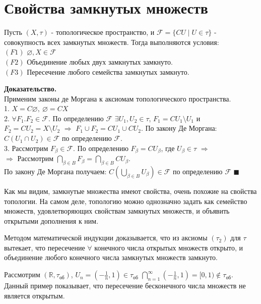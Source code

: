 \section{Свойства замкнутых множеств}
\begin{theorem}
    Пусть $(X,\tau)$ - топологическое пространство, и  $\mathcal{F}=\{
    CU\mid U\in\tau\}$ - совокупность всех замкнутых множеств. Тогда 
    выполняются условия:\\
    $(F1)$ $\varnothing,X\in\mathcal F$\\
    $(F2)$ Объединение любых двух замкнутых замкнуто.\\
    $(F3)$ Пересечение любого семейства замкнутых замкнуто.
    
\textbf{Доказательство.}\\ Применим законы де Моргана к аксиомам топологического пространства.\\
1. $X=C\varnothing,~\varnothing=CX$\\
2. $\forall F_1.F_2{\in}\mathcal{F}$. По определению $\mathcal{F}$ $\exists U_1,U_2{\in}\tau$, $F_1=CU_1{\setminus}U_1$ и $F_2=CU_2=X{\setminus}U_2$ $\Rightarrow$ $F_1{\cup}F_2=CU_1{\cup}CU_2$. По закону Де Моргана: $C(U_1{\cap}U_2){\in}\mathcal{F}$ по определению $\mathcal{F}$.\\
3. Рассмотрим $F_{\beta}{\in}\mathcal{F}$. По определению $F_{\beta}=CU_{\beta}$, где $U_{\beta}{\in}\tau$  $\Rightarrow$\\$\Rightarrow$ Рассмотрим $\bigcap\limits_{\beta{\in}B}F_{\beta}=\bigcap\limits_{\beta{\in}B}CU_{\beta}$.\\По закону Де Моргана получаем: $C(\bigcup\limits_{\beta{\in}B}U_{\beta}){\in}\mathcal{F}$ по определению $\mathcal{F}$
$\blacksquare$ \\
\end{theorem}
\begin{remark}
Как мы видим, замкнутые множества имеют свойства, очень похожие на свойства топологии. На самом деле, топологию можно однозначно задать как семейство множеств, удовлетворяющих свойствам замкнутых множеств, и объявить открытыми дополнения к ним.\end{remark} 
\begin{remark} Методом математической индукции доказывается, что из аксиомы $(\tau_2)$ для $\tau$ вытекает, что пересечение $\forall$ конечного числа открытых множеств открыто, и объединение любого конечного числа замкнутых множеств замкнуто.
\end{remark}
\begin{example} Рассмотрим $(\mathbb{R},\tau_{\text{об}})$, $U_n=(-\frac{1}{n},1){\in}\tau_{\text{об}}$ $\bigcap\limits_{n=1}^{\infty}(-\frac{1}{n},1)=[0,1){\notin}\tau_{\text{об}}$.\\
Данный пример показывает, что пересечение бесконечного числа множеств не является открытым.
\end{example}
